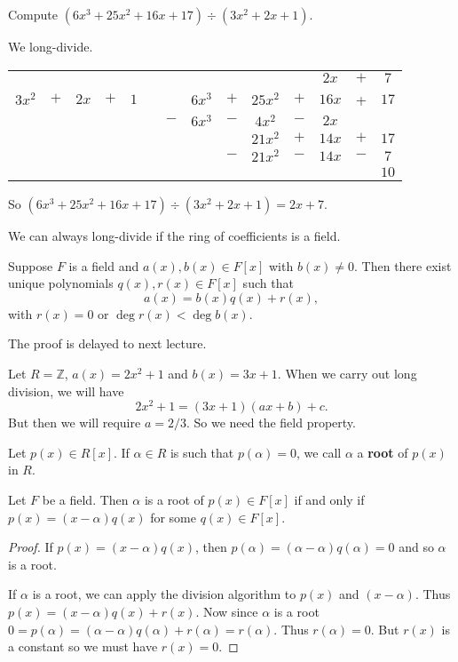 \begin{example}
	Compute $(6x^3+25x^2+16x+17)\div(3x^2+2x+1)$.
	\begin{solution}
		We long-divide.
		\begin{center}\setlength{\tabcolsep}{1pt}\renewcommand{\arraystretch}{1.2}
		\begin{tabular}{c c c c c c c c c c c c c c}
		&&&&&&&&&&&$2x$ & $+$ & $7$\\ \cline{7-14}
			$3x^2$ & $+$ & $2x$ & $+$ & $1$ &\multicolumn{1}{c|}{} & & $6x^3$ & $+$ & $25x^2$ & $+$ & $16x$ & + & $17$\\
			&&&&&& $-$ & $6x^3$ & $-$ & $4x^2$ & $-$ & $2x$\\ \cline{7-12}
			&&&&&&&&& $21x^2$ & $+$ & $14x$ & $+$ & $17$\\
			&&&&&&&& $-$ & $21x^2$ & $-$ & $14x$ & $-$ & $7$\\ \cline{9-14}
			&&&&&&&&&&&&& $10$
		\end{tabular}
		\end{center}

		So $(6x^3+25x^2+16x+17)\div(3x^2+2x+1)=2x+7$.
	\end{solution}
\end{example}

We can always long-divide if the ring of coefficients is a field.

\begin{theorem}
	Suppose $F$ is a field and $a(x),b(x)\in F[x]$ with $b(x)\neq 0$. Then there exist unique polynomials $q(x),r(x)\in F[x]$ such that $$a(x)=b(x)q(x)+r(x),$$
	with $r(x)=0$ or $\deg r(x)<\deg b(x)$.
\end{theorem}

The proof is delayed to next lecture.

\begin{example}
	Let $R=\mathbb Z$, $a(x)=2x^2+1$ and $b(x)=3x+1$. When we carry out long division, we will have
	$$2x^2+1=(3x+1)(ax+b)+c.$$
	But then we will require $a=2/3$. So we need the field property.
\end{example}

\begin{definition}[root]
	Let $p(x)\in R[x]$. If $\alpha\in R$ is such that $p(\alpha)=0$, we call $\alpha$ a \textbf{root} of $p(x)$ in $R$.
\end{definition}

\begin{corollary}
	Let $F$ be a field. Then $\alpha$ is a root of $p(x)\in F[x]$ if and only if $p(x)=(x-\alpha)q(x)$ for some $q(x)\in F[x]$.
\end{corollary}

\begin{proof}
	If $p(x)=(x-\alpha)q(x)$, then $p(\alpha)=(\alpha-\alpha)q(\alpha)=0$ and so $\alpha$ is a root.

	If $\alpha$ is a root, we can apply the division algorithm to $p(x)$ and $(x-\alpha)$. Thus $p(x)=(x-\alpha)q(x)+r(x)$. Now since $\alpha$ is a root $0=p(\alpha)=(\alpha-\alpha)q(\alpha)+r(\alpha)=r(\alpha)$. Thus $r(\alpha)=0$. But $r(x)$ is a constant so we must have $r(x)=0$.
\end{proof}